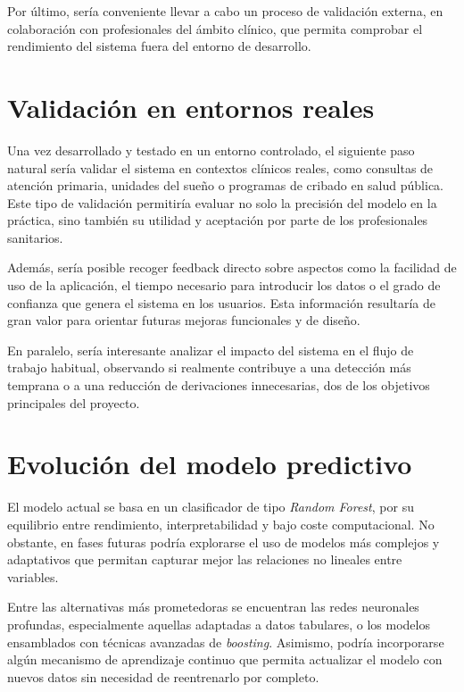 Por último, sería conveniente llevar a cabo un proceso de validación externa, en colaboración con profesionales del ámbito clínico, que permita comprobar el rendimiento del sistema fuera del entorno de desarrollo.

 
\section{Validación en entornos reales}

Una vez desarrollado y testado en un entorno controlado, el siguiente paso natural sería validar el sistema en contextos clínicos reales, como consultas de atención primaria, unidades del sueño o programas de cribado en salud pública. Este tipo de validación permitiría evaluar no solo la precisión del modelo en la práctica, sino también su utilidad y aceptación por parte de los profesionales sanitarios. 

Además, sería posible recoger feedback directo sobre aspectos como la facilidad de uso de la aplicación, el tiempo necesario para introducir los datos o el grado de confianza que genera el sistema en los usuarios. Esta información resultaría de gran valor para orientar futuras mejoras funcionales y de diseño.

En paralelo, sería interesante analizar el impacto del sistema en el flujo de trabajo habitual, observando si realmente contribuye a una detección más temprana o a una reducción de derivaciones innecesarias, dos de los objetivos principales del proyecto.

 

\section{Evolución del modelo predictivo}
El modelo actual se basa en un clasificador de tipo \textit{Random Forest}, por su equilibrio entre rendimiento, interpretabilidad y bajo coste computacional. No obstante, en fases futuras podría explorarse el uso de modelos más complejos y adaptativos que permitan capturar mejor las relaciones no lineales entre variables.

Entre las alternativas más prometedoras se encuentran las redes neuronales profundas, especialmente aquellas adaptadas a datos tabulares, o los modelos ensamblados con técnicas avanzadas de \textit{boosting}. Asimismo, podría incorporarse algún mecanismo de aprendizaje continuo que permita actualizar el modelo con nuevos datos sin necesidad de reentrenarlo por completo.

